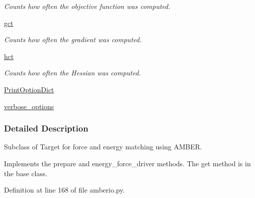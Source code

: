 \begin{DoxyCompactItemize}
\begin{DoxyCompactList}\small\item\em Counts how often the objective function was computed. \end{DoxyCompactList}\item 
\hyperlink{classforcebalance_1_1target_1_1Target_aa625ac88c6744eb14ef281d9496d0dbb}{gct}
\begin{DoxyCompactList}\small\item\em Counts how often the gradient was computed. \end{DoxyCompactList}\item 
\hyperlink{classforcebalance_1_1target_1_1Target_a5b5a42f78052b47f29ed4b940c6111a1}{hct}
\begin{DoxyCompactList}\small\item\em Counts how often the Hessian was computed. \end{DoxyCompactList}\item 
\hyperlink{classforcebalance_1_1baseclass_1_1ForceBalanceBaseClass_a5c55e661e746d1a4443f4e0bc34ebe05}{Print\-Option\-Dict}
\item 
\hyperlink{classforcebalance_1_1baseclass_1_1ForceBalanceBaseClass_a8088e1e20cbd6bc175fb9c9fe9fa0f18}{verbose\-\_\-options}
\end{DoxyCompactItemize}


\subsubsection{Detailed Description}
Subclass of Target for force and energy matching using A\-M\-B\-E\-R. 

Implements the prepare and energy\-\_\-force\-\_\-driver methods. The get method is in the base class. 

Definition at line 168 of file amberio.\-py.



